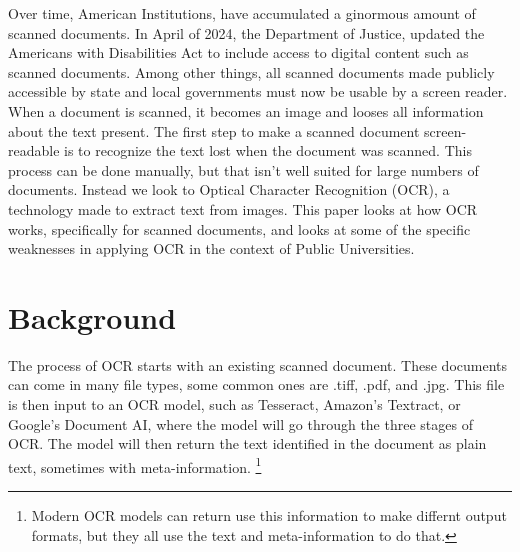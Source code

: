 \documentclass[sigplan,screen,nonacm]{acmart-tagged}
\begin{document}
Over time, American Institutions, have accumulated a ginormous amount of scanned documents.
In April of 2024, the Department of Justice, updated the Americans with Disabilities Act to include access to digital content such as scanned documents. Among other things, all scanned documents made publicly accessible by state and local governments must now be usable by a screen reader. When a document is scanned, it becomes an image and looses all information about the text present. The first step to  make a scanned document screen-readable is to recognize the text lost when the document was scanned. This process can be done manually, but that isn't well suited for large numbers of documents. Instead we look to Optical Character Recognition (OCR), a technology made to extract text from images. 
This paper looks at how OCR works, specifically for scanned documents, and looks at some of the specific weaknesses in applying OCR in the context of Public Universities.

\section{Background}
\label{sec:background}

The process of OCR starts with an existing scanned document. These documents can come in many file types, some common ones are .tiff, .pdf, and .jpg.
This file is then input to an OCR model, such as Tesseract, Amazon's Textract, or Google's Document AI, where the model will go through the three stages of OCR. The model will then return the text identified in the document as plain text, sometimes with meta-information. \footnote{Modern OCR models can return use this information to make differnt output formats, but they all use the text and meta-information to do that.}
\end{document}
